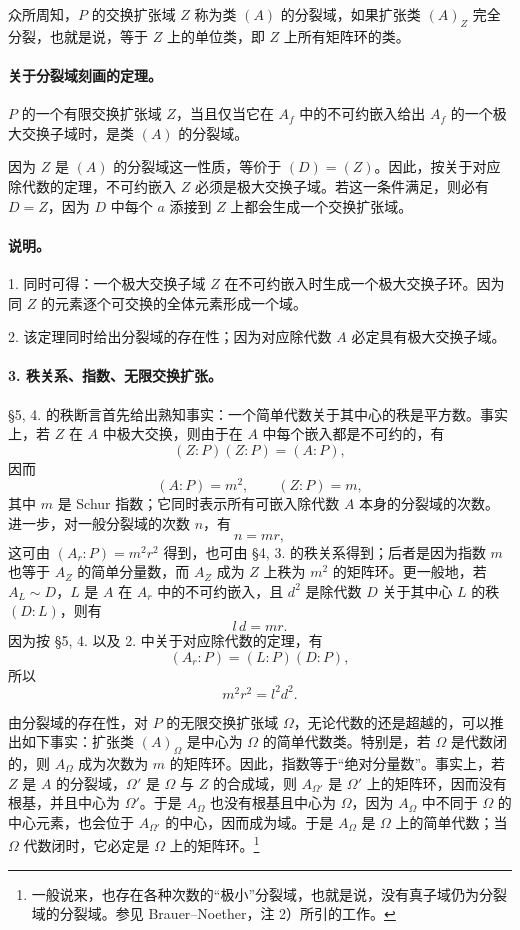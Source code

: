 众所周知，\(P\) 的交换扩张域 \(Z\) 称为类 \((A)\) 的分裂域，如果扩张类 \((A)_Z\) 完全分裂，也就是说，等于 \(Z\) 上的单位类，即 \(Z\) 上所有矩阵环的类。

\paragraph{关于分裂域刻画的定理。}
\(P\) 的一个有限交换扩张域 \(Z\)，当且仅当它在 \(A_f\) 中的不可约嵌入给出 \(A_f\) 的一个极大交换子域时，是类 \((A)\) 的分裂域。

因为 \(Z\) 是 \((A)\) 的分裂域这一性质，等价于 \((D)=(Z)\)。因此，按关于对应除代数的定理，不可约嵌入 \(Z\) 必须是极大交换子域。若这一条件满足，则必有 \(D=Z\)，因为 \(D\) 中每个 \(a\) 添接到 \(Z\) 上都会生成一个交换扩张域。

\paragraph{说明。}
1. 同时可得：一个极大交换子域 \(Z\) 在不可约嵌入时生成一个极大交换子环。因为同 \(Z\) 的元素逐个可交换的全体元素形成一个域。

2. 该定理同时给出分裂域的存在性；因为对应除代数 \(A\) 必定具有极大交换子域。

\paragraph{3. 秩关系、指数、无限交换扩张。}
§5, 4. 的秩断言首先给出熟知事实：一个简单代数关于其中心的秩是平方数。事实上，若 \(Z\) 在 \(A\) 中极大交换，则由于在 \(A\) 中每个嵌入都是不可约的，有
\[
        (Z:P)(Z:P)=(A:P),
\]
因而
\[
        (A:P)=m^2,\qquad (Z:P)=m,
\]
其中 \(m\) 是 Schur 指数；它同时表示所有可嵌入除代数 \(A\) 本身的分裂域的次数。进一步，对一般分裂域的次数 \(n\)，有
\[
        n=mr,
\]
这可由 \((A_r:P)=m^2r^2\) 得到，也可由 §4, 3. 的秩关系得到；后者是因为指数 \(m\) 也等于 \(A_Z\) 的简单分量数，而 \(A_Z\) 成为 \(Z\) 上秩为 \(m^2\) 的矩阵环。更一般地，若 \(A_L\sim D\)，\(L\) 是 \(A\) 在 \(A_r\) 中的不可约嵌入，且 \(d^2\) 是除代数 \(D\) 关于其中心 \(L\) 的秩 \((D:L)\)，则有
\[
        l\,d=mr .
\]
因为按 §5, 4. 以及 2. 中关于对应除代数的定理，有
\[
        (A_r:P)=(L:P)(D:P),
\]
所以
\[
        m^2r^2=l^2d^2 .
\]

由分裂域的存在性，对 \(P\) 的无限交换扩张域 \(\Omega\)，无论代数的还是超越的，可以推出如下事实：扩张类 \((A)_\Omega\) 是中心为 \(\Omega\) 的简单代数类。特别是，若 \(\Omega\) 是代数闭的，则 \(A_\Omega\) 成为次数为 \(m\) 的矩阵环。因此，指数等于“绝对分量数”。事实上，若 \(Z\) 是 \(A\) 的分裂域，\(\Omega'\) 是 \(\Omega\) 与 \(Z\) 的合成域，则 \(A_{\Omega'}\) 是 \(\Omega'\) 上的矩阵环，因而没有根基，并且中心为 \(\Omega'\)。于是 \(A_\Omega\) 也没有根基且中心为 \(\Omega\)，因为 \(A_\Omega\) 中不同于 \(\Omega\) 的中心元素，也会位于 \(A_{\Omega'}\) 的中心，因而成为域。于是 \(A_\Omega\) 是 \(\Omega\) 上的简单代数；当 \(\Omega\) 代数闭时，它必定是 \(\Omega\) 上的矩阵环。\footnote{一般说来，也存在各种次数的“极小”分裂域，也就是说，没有真子域仍为分裂域的分裂域。参见 Brauer--Noether，注 2）所引的工作。}

